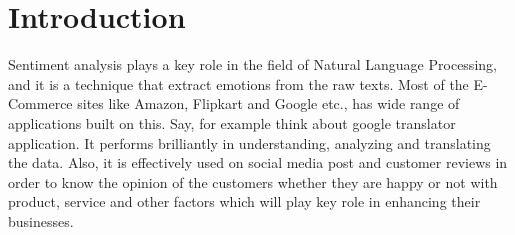 

\maketitle

  

  




\section{Introduction}
Sentiment analysis plays a key role in the field of Natural Language Processing, and it is a technique that extract emotions from the raw texts. Most of the E-Commerce sites like Amazon, Flipkart and Google etc., has wide range of applications built on this. Say, for example think about google translator application. It performs brilliantly in understanding, analyzing and translating the data. Also, it is effectively used on social media post and customer reviews in order to know the opinion of the customers whether they are happy or not with product, service and other factors which will play key role in enhancing their businesses. 
